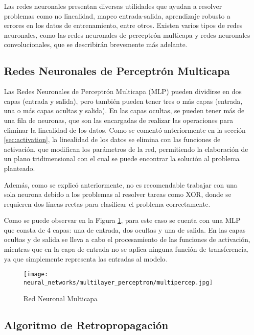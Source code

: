        Las redes neuronales presentan diversas utilidades que ayudan a resolver problemas como no linealidad, mapeo entrada-salida, aprendizaje robusto a errores en los datos de entrenamiento, entre otros. Existen varios tipos de redes neuronales, como las redes neuronales de perceptrón multicapa y redes neuronales convolucionales, que se describirán brevemente más adelante.

    \subsection{Redes Neuronales de Perceptrón Multicapa}

        Las Redes Neuronales de Perceptrón Multicapa (MLP) pueden dividirse en dos capas (entrada y salida), pero también pueden tener tres o más capas (entrada, una o más capas ocultas y salida). En las capas ocultas, se pueden tener más de una fila de neuronas, que son las encargadas de realizar las operaciones para eliminar la linealidad de los datos. Como se comentó anteriormente en la sección \ref{sec:activation}, la linealidad de los datos se elimina con las funciones de activación, que modifican los parámetros de la red, permitiendo la elaboración de un plano tridimensional con el cual se puede encontrar la solución al problema planteado.

        Además, como se explicó anteriormente, no es recomendable trabajar con una sola neurona debido a los problemas al resolver tareas como XOR, donde se requieren dos líneas rectas para clasificar el problema correctamente.

        Como se puede observar en la Figura \ref{fig:multilayer_perceptron}, para este caso se cuenta con una MLP que consta de 4 capas: una de entrada, dos ocultas y una de salida. En las capas ocultas y de salida se lleva a cabo el procesamiento de las funciones de activación, mientras que en la capa de entrada no se aplica ninguna función de transferencia, ya que simplemente representa las entradas al modelo.

        \begin{figure}[H]
            \centering
            \texttt{[image: neural\_networks/multilayer\_perceptron/multipercep.jpg]}
            \caption{Red Neuronal Multicapa}
            \label{fig:multilayer_perceptron}
        \end{figure}

    \subsection{Algoritmo de Retropropagación} \label{sec:backpropagation}

